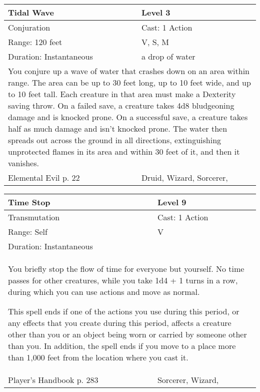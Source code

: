 \documentclass[11pt]{report}
\begin{document}
\begin{table}[H]
	\begin{tabular}{||p{6cm}|p{6cm}||}
		\hline\hline
		\bf{Tidal Wave} & Level 3\\ \hline
		Conjuration & Cast: 1 Action\\ \hline
		Range: 120 feet & V, S, M\\ \hline
		Duration: Instantaneous & a drop of water\\ \hline
		\multicolumn{2}{||p{12cm}||}{You conjure up a wave of water that crashes down on an area within range. The area can be up to 30 feet long, up to 10 feet wide, and up to 10 feet tall. Each creature in that area must make a Dexterity saving throw. On a failed save, a creature takes 4d8 bludgeoning damage and is knocked prone. On a successful save, a creature takes half as much damage and isn’t knocked prone. The water then spreads out across the ground in all directions, extinguishing unprotected flames in its area and within 30 feet of it, and then it vanishes.}\\ \hline
Elemental Evil p. 22 & Druid, Wizard, Sorcerer, \\ \hline\hline
	\end{tabular}
\end{table}

\begin{table}[H]
	\begin{tabular}{||p{6cm}|p{6cm}||}
		\hline\hline
		\bf{Time Stop} & Level 9\\ \hline
		Transmutation & Cast: 1 Action\\ \hline
		Range: Self & V\\ \hline
		Duration: Instantaneous & \\ \hline
		\multicolumn{2}{||p{12cm}||}{You briefly stop the flow of time for everyone but yourself. No time passes for other creatures, while you take 1d4 + 1 turns in a row, during which you can use actions and move as normal.

This spell ends if one of the actions you use during this period, or any effects that you create during this period, affects a creature other than you or an object being worn or carried by someone other than you. In addition, the spell ends if you move to a place more than 1,000 feet from the location where you cast it.}\\ \hline
Player's Handbook p. 283 & Sorcerer, Wizard, \\ \hline\hline
	\end{tabular}
\end{table}
\end{document}
